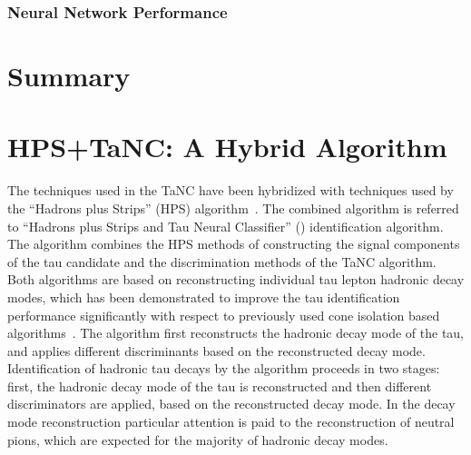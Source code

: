 \subsubsection{Neural Network Performance}
\label{sec:NeuralNetworkPerformance}

\section{Summary}


\section{HPS+TaNC: A Hybrid Algorithm}
\label{sec:TauId} 
%
The techniques used in the TaNC have been hybridized with techniques used by the
``Hadrons plus Strips'' (HPS) algorithm~\cite{CMS_AN_2010-082}.  The combined
algorithm is referred to ``Hadrons plus Strips and Tau Neural Classifier''
(\hpsTanc) identification algorithm.  The algorithm combines the HPS methods of
constructing the signal components of the tau candidate and the discrimination
methods of the TaNC algorithm.  Both algorithms are based on reconstructing
individual tau lepton hadronic decay modes, which has been demonstrated to
improve the tau identification performance significantly with respect to
previously used cone isolation based algorithms~\cite{CMS-PAS-PFT-10-004}.  The
\hpsTanc algorithm first reconstructs the hadronic decay mode of the tau, and
applies different discriminants based on the reconstructed decay mode.
Identification of hadronic tau decays by the \hpsTanc algorithm proceeds in two
stages: first, the hadronic decay mode of the tau is reconstructed and then
different discriminators are applied, based on the reconstructed decay mode.  In
the decay mode reconstruction particular attention is paid to the reconstruction
of neutral pions, which are expected for the majority of hadronic decay modes.

